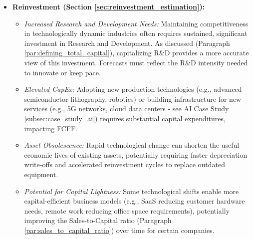 \begin{itemize}
    \item \textbf{Reinvestment (Section \ref{sec:reinvestment_estimation}):}
          \begin{itemize}
              \item \textit{Increased Research and Development Needs:} Maintaining competitiveness in technologically dynamic industries often requires sustained, significant investment in Research and Development. As discussed (Paragraph \ref{par:defining_total_capital}), capitalizing R\&D provides a more accurate view of this investment. Forecasts must reflect the R\&D intensity needed to innovate or keep pace.
              \item \textit{Elevated CapEx:} Adopting new production technologies (e.g., advanced semiconductor lithography, robotics) or building infrastructure for new services (e.g., 5G networks, cloud data centers - see AI Case Study \ref{subsec:case_study_ai}) requires substantial capital expenditures, impacting FCFF.
              \item \textit{Asset Obsolescence:} Rapid technological change can shorten the useful economic lives of existing assets, potentially requiring faster depreciation write-offs and accelerated reinvestment cycles to replace outdated equipment.
              \item \textit{Potential for Capital Lightness:} Some technological shifts enable more capital-efficient business models (e.g., SaaS reducing customer hardware needs, remote work reducing office space requirements), potentially improving the Sales-to-Capital ratio (Paragraph \ref{par:sales_to_capital_ratio}) over time for certain companies.
          \end{itemize}


\end{itemize}
